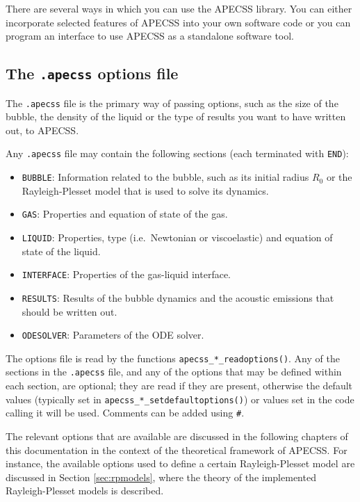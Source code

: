 There are several ways in which you can use the APECSS library. You can either incorporate selected features of APECSS into your own software code or you can program an interface to use APECSS as a standalone software tool. 

\subsection{The {\tt *.apecss} options file}

The {\tt *.apecss} file is the primary way of passing options, such as the size of the bubble, the density of the liquid or the type of results you want to have written out, to APECSS. 

Any {\tt *.apecss} file may contain the following sections (each terminated with {\tt END}):
\vspace{-1em}
\begin{itemize}[noitemsep]
  \item {\tt BUBBLE}: Information related to the bubble, such as its initial radius $R_0$ or the Rayleigh-Plesset model that is used to solve its dynamics.
  \item {\tt GAS}: Properties and equation of state of the gas.
  \item {\tt LIQUID}: Properties, type (i.e.~Newtonian or viscoelastic) and equation of state of the liquid.
  \item {\tt INTERFACE}: Properties of the gas-liquid interface. 
  \item {\tt RESULTS}: Results of the bubble dynamics and the acoustic emissions that should be written out.
  \item {\tt ODESOLVER}: Parameters of the ODE solver.
\end{itemize}
The options file is read by the functions {\tt apecss\_*\_readoptions()}. Any of the sections in the {\tt *.apecss} file, and any of the options that may be defined within each section, are optional; they are read if they are present, otherwise the default values (typically set in {\tt apecss\_*\_setdefaultoptions()}) or values set in the code calling it will be used. Comments can be added using {\tt \#}.

The relevant options that are available are discussed in the following chapters of this documentation in the context of the theoretical framework of APECSS. For instance, the available options used to define a certain Rayleigh-Plesset model are discussed in Section \ref{sec:rpmodels}, where the theory of the implemented Rayleigh-Plesset models is described. 

